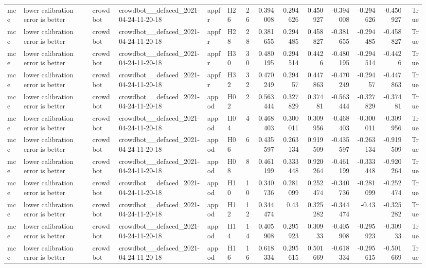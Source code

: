 \begin{longtable}{llllllrrrrrrrr}
mce & lower calibration error is better & crowdbot & crowdbot\_\_defaced\_2021-04-24-11-20-18 & appfr & H26 & 26 & 0.394008 & 0.294626 & 0.450927 & -0.394008 & -0.294626 & -0.450927 & True \\
mce & lower calibration error is better & crowdbot & crowdbot\_\_defaced\_2021-04-24-11-20-18 & appfr & H28 & 28 & 0.381655 & 0.294485 & 0.458827 & -0.381655 & -0.294485 & -0.458827 & True \\
mce & lower calibration error is better & crowdbot & crowdbot\_\_defaced\_2021-04-24-11-20-18 & appfr & H30 & 30 & 0.480195 & 0.294514 & 0.4426 & -0.480195 & -0.294514 & -0.4426 & True \\
mce & lower calibration error is better & crowdbot & crowdbot\_\_defaced\_2021-04-24-11-20-18 & appfr & H32 & 32 & 0.470249 & 0.29457 & 0.447863 & -0.470249 & -0.29457 & -0.447863 & True \\
mce & lower calibration error is better & crowdbot & crowdbot\_\_defaced\_2021-04-24-11-20-18 & appod & H02 & 2 & 0.563444 & 0.327829 & 0.37481 & -0.563444 & -0.327829 & -0.37481 & True \\
mce & lower calibration error is better & crowdbot & crowdbot\_\_defaced\_2021-04-24-11-20-18 & appod & H04 & 4 & 0.468403 & 0.300011 & 0.309956 & -0.468403 & -0.300011 & -0.309956 & True \\
mce & lower calibration error is better & crowdbot & crowdbot\_\_defaced\_2021-04-24-11-20-18 & appod & H06 & 6 & 0.435597 & 0.263134 & 0.919509 & -0.435597 & -0.263134 & -0.919509 & True \\
mce & lower calibration error is better & crowdbot & crowdbot\_\_defaced\_2021-04-24-11-20-18 & appod & H08 & 8 & 0.461199 & 0.333448 & 0.920264 & -0.461199 & -0.333448 & -0.920264 & True \\
mce & lower calibration error is better & crowdbot & crowdbot\_\_defaced\_2021-04-24-11-20-18 & appod & H10 & 10 & 0.340736 & 0.281099 & 0.252474 & -0.340736 & -0.281099 & -0.252474 & True \\
mce & lower calibration error is better & crowdbot & crowdbot\_\_defaced\_2021-04-24-11-20-18 & appod & H12 & 12 & 0.344474 & 0.43 & 0.325282 & -0.344474 & -0.43 & -0.325282 & True \\
mce & lower calibration error is better & crowdbot & crowdbot\_\_defaced\_2021-04-24-11-20-18 & appod & H14 & 14 & 0.405908 & 0.295923 & 0.30933 & -0.405908 & -0.295923 & -0.30933 & True \\
mce & lower calibration error is better & crowdbot & crowdbot\_\_defaced\_2021-04-24-11-20-18 & appod & H16 & 16 & 0.618334 & 0.295615 & 0.501669 & -0.618334 & -0.295615 & -0.501669 & True \\

\end{longtable}
